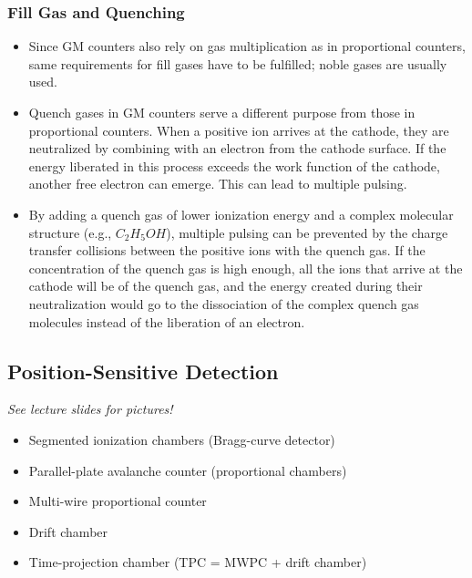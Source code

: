 \subsubsection{Fill Gas and Quenching}
\begin{itemize}
    \item Since GM counters also rely on gas multiplication as in proportional counters, same requirements for fill gases have to be fulfilled; noble gases are usually used. 
    \item Quench gases in GM counters serve a different purpose from those in proportional counters. When a positive ion arrives at the cathode, they are neutralized by combining with an electron from the cathode surface. If the energy liberated in this process exceeds the work function of the cathode, another free electron can emerge. This can lead to multiple pulsing. 
    \item By adding a quench gas of lower ionization energy and a complex molecular structure (e.g., $C_2H_5OH$), multiple pulsing can be prevented by the charge transfer collisions between the positive ions with the quench gas. If the concentration of the quench gas is high enough, all the ions that arrive at the cathode will be of the quench gas, and the energy created during their neutralization would go to the dissociation of the complex quench gas molecules instead of the liberation of an electron.  
\end{itemize}

\subsection{Position-Sensitive Detection}
\emph{See lecture slides for pictures!}
\begin{itemize}
    \item Segmented ionization chambers (Bragg-curve detector)
    \item Parallel-plate avalanche counter (proportional chambers)
    \item Multi-wire proportional counter 
    \item Drift chamber
    \item Time-projection chamber (TPC = MWPC + drift chamber)
\end{itemize}